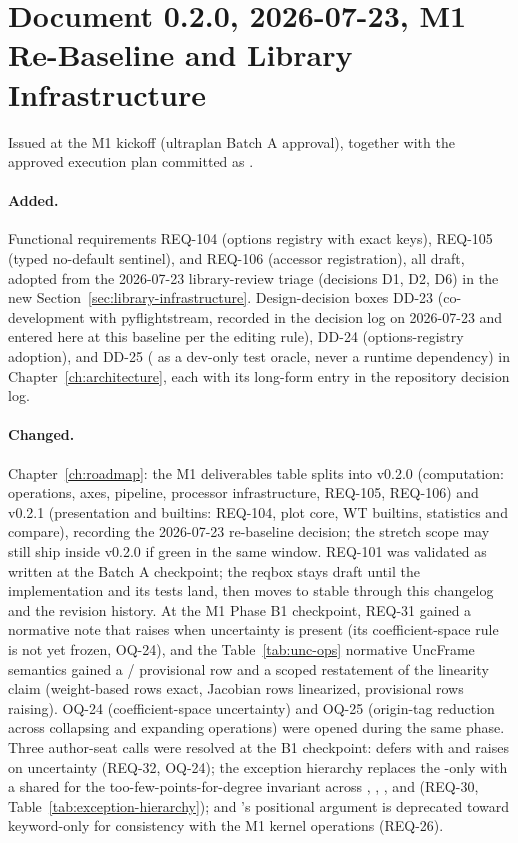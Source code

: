 \section*{Document 0.2.0, 2026-07-23, M1 Re-Baseline and Library Infrastructure}

Issued at the M1 kickoff (ultraplan Batch A approval), together with
the approved execution plan committed as
.

\paragraph{Added.} Functional requirements REQ-104 (options registry
with exact keys), REQ-105 (typed no-default sentinel), and REQ-106
(accessor registration), all draft, adopted from the 2026-07-23
library-review triage (decisions D1, D2, D6) in the new
Section~\ref{sec:library-infrastructure}. Design-decision boxes DD-23
(co-development with pyflightstream, recorded in the decision log on
2026-07-23 and entered here at this baseline per the editing rule),
DD-24 (options-registry adoption), and DD-25 ( as
a dev-only test oracle, never a runtime dependency) in
Chapter~\ref{ch:architecture}, each with its long-form entry in the
repository decision log.

\paragraph{Changed.} Chapter~\ref{ch:roadmap}: the M1 deliverables
table splits into v0.2.0 (computation: operations, axes, pipeline,
processor infrastructure, REQ-105, REQ-106) and v0.2.1 (presentation
and builtins: REQ-104, plot core, WT builtins, statistics and
compare), recording the 2026-07-23 re-baseline decision; the stretch
scope may still ship inside v0.2.0 if green in the same window.
REQ-101 was validated as written at the Batch A checkpoint; the
reqbox stays draft until the implementation and its tests land, then
moves to stable through this changelog and the revision history.
At the M1 Phase B1 checkpoint, REQ-31 gained a normative note that
 raises when uncertainty is present (its
coefficient-space rule is not yet frozen, OQ-24), and the
Table~\ref{tab:unc-ops} normative UncFrame semantics gained a
/ provisional row and a scoped
restatement of the linearity claim (weight-based rows exact, Jacobian
rows linearized, provisional rows raising). OQ-24 (coefficient-space
uncertainty) and OQ-25 (origin-tag reduction across collapsing and
expanding operations) were opened during the same phase. Three
author-seat calls were resolved at the B1 checkpoint: 
defers with  and raises on uncertainty (REQ-32,
OQ-24); the exception hierarchy replaces the -only
 with a shared  for the
too-few-points-for-degree invariant across , ,
, and  (REQ-30,
Table~\ref{tab:exception-hierarchy}); and 's positional
 argument is deprecated toward keyword-only for
consistency with the M1 kernel operations (REQ-26).

